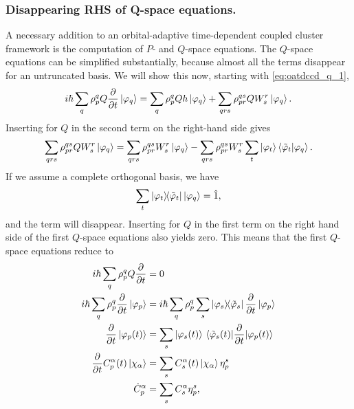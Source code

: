     \begin{figure}[h]
    
    \end{figure}

    \subsubsection{Disappearing RHS of Q-space equations.}

    A necessary addition to an orbital-adaptive time-dependent coupled cluster framework 
    is the computation of $P$- and $Q$-space equations. The $Q$-space equations can 
    be simplified substantially, because almost all the terms disappear for an 
    untruncated basis. 
    We will show this now, starting with \autoref{eq:oatdccd_q_1},
    \begin{equation}
        i\hbar\sum_q \rho^q_p Q \frac{\partial}{\partial t} \ket{\varphi_q} 
        = \sum_q \rho^q_p Q h\ket{\varphi_q}
        + \sum_{qrs} \rho^{qs}_{pr} Q W^r_s \ket{\varphi_q}.
    \end{equation}
    Inserting for $Q$ in the second term on the right-hand side gives
    \begin{equation}
        \sum_{qrs} \rho^{qs}_{pr} Q W^r_s \ket{\varphi_q} 
        = \sum_{qrs} \rho^{qs}_{pr} W^r_s\ket{\varphi_q} 
        - \sum_{qrs} \rho^{qs}_{pr} W^r_s
            \sum_t \ket{\varphi_t}\braket{\tilde{\varphi}_t}{\varphi_q}.
    \end{equation}
    If we assume a complete orthogonal basis, we have 
    \begin{equation*}
        \sum_t \dyad{\varphi_t}{\tilde{\varphi}_t}\ket{\varphi_q} = \hat{1},
    \end{equation*}
    and the term will disappear. Inserting for $Q$ in the first term on the 
    right hand side of the first $Q$-space equations also yields zero. This 
    means that the first $Q$-space equations reduce to 
    \begin{equation}
        \begin{aligned}
        i\hbar \sum_q \rho^q_p Q \frac{\partial}{\partial t} &= 0 \\
        i\hbar \sum_q \rho^q_p \frac{\partial}{\partial t} \ket{\varphi_p}
        &=
        i\hbar \sum_q \rho^q_p
            \sum_s \dyad{\varphi_s}{\tilde{\varphi}_s}\frac{\partial}{\partial t}
            \ket{\varphi_p} \\
        \frac{\partial}{\partial t}\ket{\varphi_p(t)}
        &=
        \sum_s \ket{\varphi_s(t)}
            \mel*{\tilde{\varphi}_s(t)}{\frac{\partial}{\partial t}}{\varphi_p(t)} \\
        \frac{\partial}{\partial t} C^\alpha_p(t) \ket{\chi_\alpha}
        &=
        \sum_s C^\alpha_s(t) \ket{\chi_\alpha} \eta^s_p \\
        \dot{C}^\alpha_p &= \sum_s C^\alpha_s \eta^s_p,
        \end{aligned}
    \end{equation}
